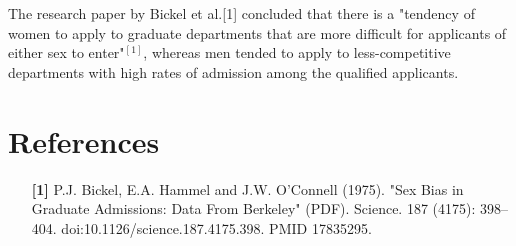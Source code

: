 \documentclass{article}
\begin{document}
The research paper by Bickel et al.[1] concluded that there is a "tendency of women to apply to graduate departments that are more difficult for applicants of either sex to enter"$^[1]$, whereas men tended to apply to less-competitive departments with high rates of admission among the qualified applicants.

\section{References}
\begin{itemize}
    \item[\textbf{[1]}] P.J. Bickel, E.A. Hammel and J.W. O'Connell (1975). "Sex Bias in Graduate Admissions: Data From Berkeley" (PDF). Science. 187 (4175): 398–404. doi:10.1126/science.187.4175.398. PMID 17835295.
\end{itemize}
\end{document}

